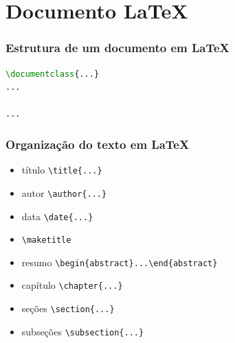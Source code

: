 \section{Documento \LaTeX{}}
\begin{frame}[fragile]
\frametitle{Estrutura de um documento em \LaTeX{}}
\begin{lstlisting}[language=tex, label=lst-estrutura, caption={Estrutura de um documento em \LaTeX{}}, postbreak=\mbox{$\hookrightarrow$\space}]
\documentclass{...}
...

...

\end{lstlisting} %
\end{frame}

\begin{frame}[fragile]
\frametitle{Organização do texto em \LaTeX{}}
\begin{itemize}
\item título \verb|\title{...}|
\item autor \verb|\author{...}|
\item data \verb|\date{...}|
\item \verb|\maketitle|
\end{itemize}
\vspace{3ex}
\begin{itemize}
\item resumo \verb|\begin{abstract}...\end{abstract}|
\item capítulo \verb|\chapter{...}|
\item seções \verb|\section{...}|
\item subseções \verb|\subsection{...}|
\end{itemize}
\end{frame}

